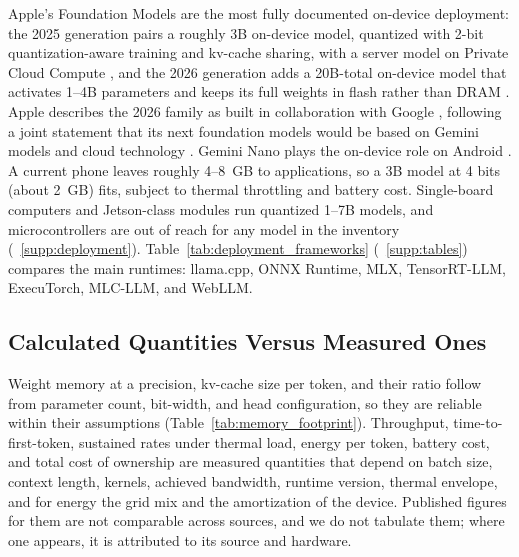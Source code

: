 Apple's Foundation Models are the most fully documented on-device deployment: the 2025 generation pairs a roughly 3B on-device model, quantized with 2-bit quantization-aware training and \gls{kv}-cache sharing, with a server model on Private Cloud Compute \citep{gunter2025afm}, and the 2026 generation adds a 20B-total on-device model that activates 1--4B parameters and keeps its full weights in flash rather than DRAM \citep{apple2026afm3}. Apple describes the 2026 family as built in collaboration with Google \citep{apple2026afm3}, following a joint statement that its next foundation models would be based on Gemini models and cloud technology \citep{google_apple2026statement}. Gemini Nano plays the on-device role on Android \citep{gemini2023}. A current phone leaves roughly 4--8~GB to applications, so a 3B model at 4 bits (about 2~GB) fits, subject to thermal throttling and battery cost. Single-board computers and Jetson-class modules run quantized 1--7B models, and microcontrollers are out of reach for any model in the inventory (\suppsec~\ref{supp:deployment}). Table~\ref{tab:deployment_frameworks} (\suppsec~\ref{supp:tables}) compares the main runtimes: llama.cpp, ONNX Runtime, MLX, TensorRT-LLM, ExecuTorch, MLC-LLM, and WebLLM.
\label{subsec:deployment_frameworks}

\subsection{Calculated Quantities Versus Measured Ones}
\label{subsec:deployment_latency}
\label{subsec:deployment_calc_vs_meas}

Weight memory at a precision, \gls{kv}-cache size per token, and their ratio follow from parameter count, bit-width, and head configuration, so they are reliable within their assumptions (Table~\ref{tab:memory_footprint}). Throughput, time-to-first-token, sustained rates under thermal load, energy per token, battery cost, and total cost of ownership are measured quantities that depend on batch size, context length, kernels, achieved bandwidth, runtime version, thermal envelope, and for energy the grid mix and the amortization of the device. Published figures for them are not comparable across sources, and we do not tabulate them; where one appears, it is attributed to its source and hardware.

